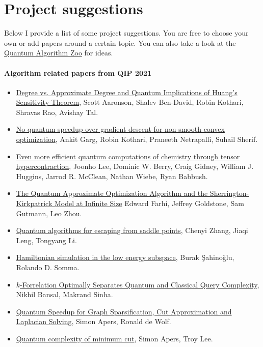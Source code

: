 \documentclass[12pt]{article}
\begin{document}
\section*{Project suggestions}
Below I provide a list of some project suggestions.  You are free to choose your own or add papers around a certain topic.  You can also take a look at the 
\href{https://quantumalgorithmzoo.org/}{Quantum Algorithm Zoo} for ideas.  

\paragraph*{Algorithm related papers from QIP 2021}
\begin{itemize}
  \item \href{https://arxiv.org/abs/2010.12629}{Degree vs. Approximate Degree and Quantum Implications of Huang's Sensitivity Theorem}, Scott Aaronson, Shalev Ben-David, Robin Kothari, Shravas Rao, Avishay Tal.
  \item \href{https://arxiv.org/abs/2010.01801}{No quantum speedup over gradient descent for non-smooth convex optimization}, Ankit Garg, Robin Kothari, Praneeth Netrapalli, Suhail Sherif.
  \item \href{https://arxiv.org/abs/2011.03494}{Even more efficient quantum computations of chemistry through tensor hypercontraction}, Joonho Lee, Dominic W. Berry, Craig Gidney, William J. Huggins, Jarrod R. McClean, Nathan Wiebe, Ryan Babbush.
  \item \href{https://arxiv.org/abs/1910.08187}{The Quantum Approximate Optimization Algorithm and the Sherrington-Kirkpatrick Model at Infinite Size} Edward Farhi, Jeffrey Goldstone, Sam Gutmann, Leo Zhou.
  \item \href{https://arxiv.org/abs/2007.10253}{Quantum algorithms for escaping from saddle points}, Chenyi Zhang, Jiaqi Leng, Tongyang Li.
  \item \href{https://arxiv.org/abs/2006.02660}{Hamiltonian simulation in the low energy subspace}, Burak \c{S}ahino\u{g}lu, Rolando D. Somma.
  \item \href{https://arxiv.org/abs/2008.07003}{$k$-Forrelation Optimally Separates Quantum and Classical Query Complexity}, Nikhil Bansal, Makrand Sinha.
  \item \href{https://arxiv.org/abs/1911.07306}{Quantum Speedup for Graph Sparsification, Cut Approximation and Laplacian Solving}, Simon Apers, Ronald de Wolf.
  \item \href{https://arxiv.org/abs/2011.09823}{Quantum complexity of minimum cut}, Simon Apers, Troy Lee.

\end{itemize}
\end{document}

